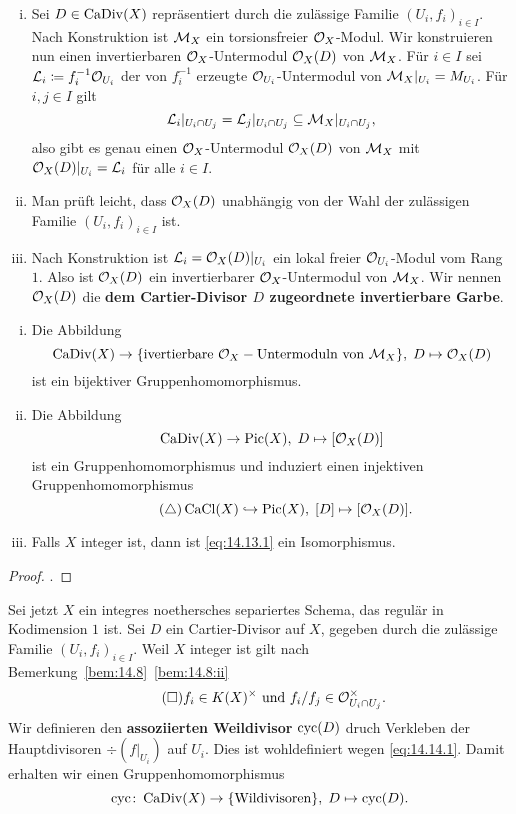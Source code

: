\begin{kons}
\label{kons:14.12}
	\begin{enumerate}[i)]
		\item Sei $D \in \operatorname{CaDiv}(X)$ repräsentiert durch die zulässige Familie $(U_i,f_i)_{i \in I}$. Nach Konstruktion ist $\mathcal{M}_X$ ein torsionsfreier $\mathcal{O}_X$-Modul. Wir konstruieren nun einen invertierbaren $\mathcal{O}_X$-Untermodul $\mathcal{O}_X(D)$ von $\mathcal{M}_X$. Für $i \in I$ sei $\mathcal{L}_i\coloneqq f_i^{-1}\mathcal{O}_{U_i}$ der von $f_i^{-1}$ erzeugte $\mathcal{O}_{U_i}$-Untermodul von $\mathcal{M}_X\vert_{U_i} = M_{U_i}$. Für $i,j \in I$ gilt
		\[
			\mathcal{L}_i\vert_{U_i\cap U_j} = \mathcal{L}_j\vert_{U_i\cap U_j} \subseteq \mathcal{M}_X\vert_{U_i \cap U_j},
		\]
		also gibt es genau einen $\mathcal{O}_X$-Untermodul $\mathcal{O}_X(D)$ von $\mathcal{M}_X$ mit $\mathcal{O}_X(D)\vert_{U_i} = \mathcal{L}_i$ für alle $i \in I$.
		\item Man prüft leicht, dass $\mathcal{O}_X(D)$ unabhängig von der Wahl der zulässigen Familie $(U_i,f_i)_{i\in I}$ ist.
		\item Nach Konstruktion ist $\mathcal{L}_i=\mathcal{O}_X(D)\vert_{U_i}$ ein lokal freier $\mathcal{O}_{U_i}$-Modul vom Rang $1$. Also ist $\mathcal{O}_X(D)$ ein invertierbarer $\mathcal{O}_X$-Untermodul von $\mathcal{M}_X$. Wir nennen $\mathcal{O}_X(D)$ die \textbf{dem Cartier-Divisor $D$ zugeordnete invertierbare Garbe}.
	\end{enumerate}
\end{kons}

\begin{prop}
\label{prop:14.13}
	\begin{enumerate}[i)]
		\item Die Abbildung
		\[
			\operatorname{CaDiv}(X) \to \{\text{ivertierbare }\mathcal{O}_X-\text{Untermoduln von }\mathcal{M}_X\},\; D \mapsto \mathcal{O}_X(D)
		\]
		ist ein bijektiver Gruppenhomomorphismus.
		\item Die Abbildung
		\[
			\operatorname{CaDiv}(X)\to \operatorname{Pic}(X),\; D \mapsto [\mathcal{O}_X(D)]
		\]
		ist ein Gruppenhomomorphismus und induziert einen injektiven Gruppenhomomorphismus
		\[\label{eq:14.13.1}\tag{$\triangle$}
			\operatorname{CaCl}(X) \hookrightarrow \operatorname{Pic}(X),\; [D] \mapsto [\mathcal{O}_X(D)].
		\]
		\item Falls $X$ integer ist, dann ist \eqref{eq:14.13.1} ein Isomorphismus.
	\end{enumerate}
	\begin{proof}
		\cite[Propositionen~II.6.13-II.6.15]{hartshorne1977algebraic}.
	\end{proof}
\end{prop}

\begin{bem}
\label{bem:14.14}
	Sei jetzt $X$ ein integres noethersches separiertes Schema, das regulär in Kodimension $1$ ist. Sei $D$ ein Cartier-Divisor auf $X$, gegeben durch die zulässige Familie $(U_i,f_i)_{i \in I}$. Weil $X$ integer ist gilt nach Bemerkung~\ref{bem:14.8}~\ref{bem:14.8:ii}
	\[\label{eq:14.14.1}\tag{$\square$}
		f_i \in K(X)^\times \text{ und } f_i/f_j \in \mathcal{O}_{U_i\cap U_j}^\times.
	\]
	Wir definieren den \textbf{assoziierten Weildivisor} $\operatorname{cyc}(D)$ druch Verkleben der Hauptdivisoren $\div(f\vert_{U_i})$ auf $U_i$. Dies ist wohldefiniert wegen \eqref{eq:14.14.1}. Damit erhalten wir einen Gruppenhomomorphismus
	\[
		\operatorname{cyc}\colon \operatorname{CaDiv}(X) \to \{\text{Wildivisoren}\},\; D \mapsto \operatorname{cyc}(D).
	\]
\end{bem}

